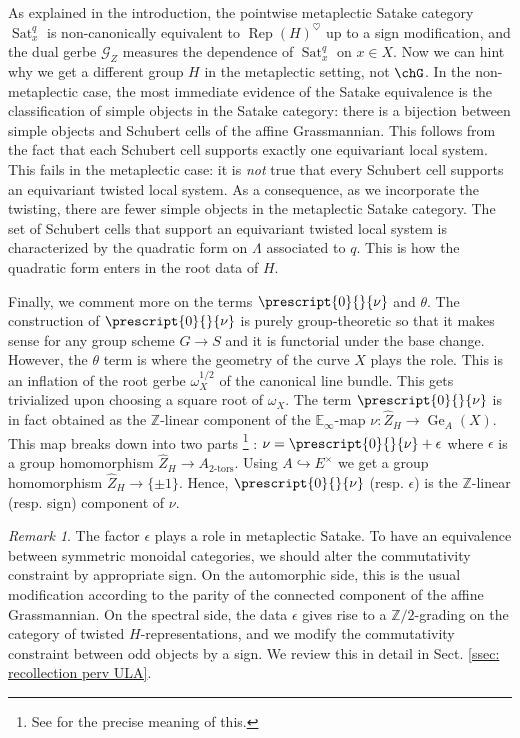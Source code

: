 \documentclass[10pt]{amsart}
\theoremstyle{remark}
\newtheorem{rmk}[subsubsection]{Remark}
\newcommand{\te}{\text}
\newcommand{\wh}{\widehat}
\newcommand{\E}{\mathbb{E}}
\newcommand{\Z}{\mathbb{Z}}
\newcommand{\on}{\operatorname}
\newcommand{\cG}{\mathcal{G}}
\newcommand{\Rep}{\on{Rep}}
\newcommand{\Sat}{\on{Sat}}
\begin{document}
As explained in the introduction, the pointwise metaplectic Satake category $\Sat^q_x$ is non-canonically equivalent to $\Rep(H)^{\heartsuit}$ up to a sign modification, and the dual gerbe $\cG_Z$ measures the dependence of $\Sat^q_x$ on $x\in X$. Now we can hint why we get a different group $H$ in the metaplectic setting, not $\chG$. In the non-metaplectic case, the most immediate evidence of the Satake equivalence is the classification of simple objects in the Satake category: there is a bijection between simple objects and Schubert cells of the affine Grassmannian. This follows from the fact that each Schubert cell supports exactly one equivariant local system. This fails in the metaplectic case: it is \emph{not} true that every Schubert cell supports an equivariant twisted local system. As a consequence, as we incorporate the twisting, there are fewer simple objects in the metaplectic Satake category. The set of Schubert cells that support an equivariant twisted local system is characterized by the quadratic form on $\Lambda$ associated to $q$. This is how the quadratic form enters in the root data of $H$.
\medskip

Finally, we comment more on the terms $\prescript{0}{}{\nu}$ and $\theta$. The construction of $\prescript{0}{}{\nu}$ is purely group-theoretic so that it makes sense for any group scheme $G\rightarrow S$ and it is functorial under the base change. However, the $\theta$ term is where the geometry of the curve $X$ plays the role. This is an inflation of the root gerbe $\omega^{1/2}_X$ of the canonical line bundle. This gets trivialized upon choosing a square root of $\omega_X$. The term $\prescript{0}{}{\nu}$ is in fact obtained as the $\Z$-linear component of the $\E_{\infty}$-map
$\nu:\wh{Z}_H\rightarrow \on{Ge}_{A}(X)$. This map breaks down into two parts \footnote{See \cite[Sect. 4.8.1]{GL} for the precise meaning of this.} : $\nu=\prescript{0}{}{\nu}+\epsilon$ where $\epsilon$ is a group homomorphism $\wh{Z}_H\rightarrow A_{2\te{-tors}}$. Using $A\hookrightarrow E^{\times}$ we get a group homomorphism $\wh{Z}_H\rightarrow \{\pm 1\}$. Hence, $\prescript{0}{}{\nu}$ (resp. $\epsilon$) is the $\Z$-linear (resp. sign) component of $\nu$.

\begin{rmk}\label{rmk: role of eps}
The factor $\epsilon$ plays a role in metaplectic Satake.
To have an equivalence between symmetric monoidal categories, we should alter the commutativity constraint by appropriate sign. On the automorphic side, this is the usual modification according to the parity of the connected component of the affine Grassmannian. On the spectral side, the data $\epsilon$ gives rise to a $\Z/2$-grading on the category of twisted $H$-representations, and we modify the commutativity constraint between odd objects by a sign. We review this in detail in Sect. \ref{ssec: recollection perv ULA}.
\end{rmk}
\end{document}

